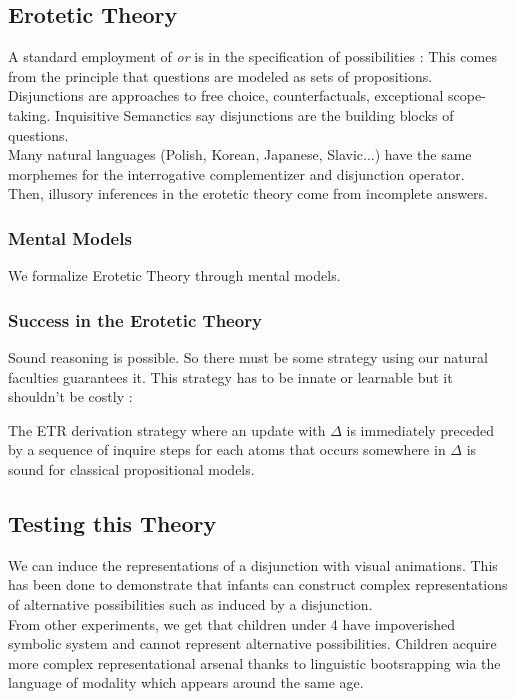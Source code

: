 \documentclass{cours}
\begin{document}
\subsection{Erotetic Theory}
A standard employment of \textsl{or} is in the specification of possibilities : This comes from the principle that questions are modeled as sets of propositions. \\ Disjunctions are approaches to free choice, counterfactuals, exceptional scope-taking. Inquisitive Semanctics say disjunctions are the building blocks of questions. \\
Many natural languages (Polish, Korean, Japanese, Slavic...) have the same morphemes for the interrogative complementizer and disjunction operator.\\

Then, illusory inferences in the erotetic theory come from incomplete answers.

\subsubsection{Mental Models}
We formalize Erotetic Theory through mental models. %

\subsubsection{Success in the Erotetic Theory}
Sound reasoning is possible. So there must be some strategy using our natural faculties guarantees it. This strategy has to be innate or learnable but it shouldn't be costly :
\begin{theorem}
    The ETR derivation strategy where an update with $\Delta$ is immediately preceded by a sequence of inquire steps for each atoms that occurs somewhere in $\Delta$ is sound for classical propositional models.
\end{theorem}

\subsection{Testing this Theory}
We can induce the representations of a disjunction with visual animations. This has been done to demonstrate that infants can construct complex representations of alternative possibilities such as induced by a disjunction. \\
From other experiments, we get that children under 4 have impoverished symbolic system and cannot represent alternative possibilities. Children acquire more complex representational arsenal thanks to linguistic bootsrapping wia the language of modality which appears around the same age.
\end{document}
